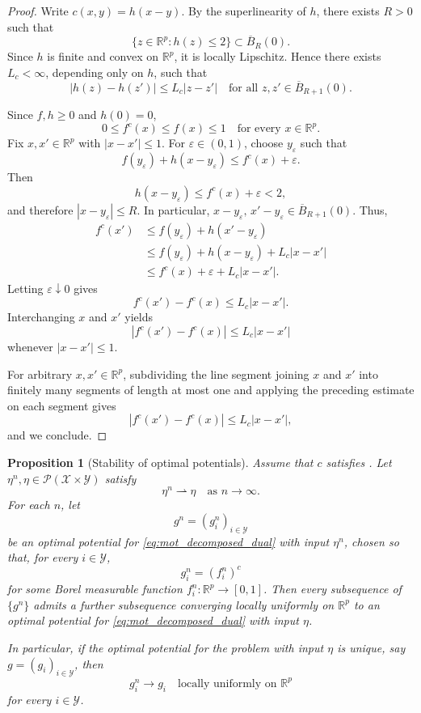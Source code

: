 \documentclass{amsart}
\theoremstyle{plain}
\numberwithin{equation}{section}\newtheorem{theorem}{Theorem}[section]
\newtheorem{proposition}[theorem]{Proposition}
\theoremstyle{remark}
\begin{document}
\begin{proof}
Write $c(x,y)=h(x-y)$. By the superlinearity of $h$, there exists
$R>0$ such that
\[
    \{z\in\mathbb R^p:h(z)\leq2\}
    \subset \overline B_R(0).
\]
Since $h$ is finite and convex on $\mathbb R^p$, it is locally
Lipschitz. Hence there exists $L_c<\infty$, depending only on $h$,
such that
\[
    |h(z)-h(z')|
    \leq
    L_c|z-z'|
    \quad
    \text{for all }
    z,z'\in\overline B_{R+1}(0).
\]

Since $f,h\geq0$ and $h(0)=0$,
\[
    0\leq f^c(x)\leq f(x)\leq1
    \quad
    \text{for every }x\in\mathbb R^p.
\]
Fix $x,x'\in\mathbb R^p$ with $|x-x'|\leq1$. For
$\varepsilon\in(0,1)$, choose $y_\varepsilon$ such that
\[
    f(y_\varepsilon)+h(x-y_\varepsilon)
    \leq
    f^c(x)+\varepsilon.
\]
Then
\[
    h(x-y_\varepsilon)
    \leq
    f^c(x)+\varepsilon
    <2,
\]
and therefore $|x-y_\varepsilon|\leq R$.
In particular, $x-y_\varepsilon,\,
    x'-y_\varepsilon
    \in\overline B_{R+1}(0)$.
Thus,
\begin{align*}
    f^c(x')
    &\leq
    f(y_\varepsilon)+h(x'-y_\varepsilon)\\
    &\leq
    f(y_\varepsilon)+h(x-y_\varepsilon)
    +L_c|x-x'|\\
    &\leq
    f^c(x)+\varepsilon+L_c|x-x'|.
\end{align*}
Letting $\varepsilon\downarrow0$ gives
\[
    f^c(x')-f^c(x)
    \leq
    L_c|x-x'|.
\]
Interchanging $x$ and $x'$ yields
\[
    |f^c(x')-f^c(x)|
    \leq
    L_c|x-x'|
\]
whenever $|x-x'|\leq1$.

For arbitrary $x,x'\in\mathbb R^p$, subdividing the line segment
joining $x$ and $x'$ into finitely many segments of length at most one
and applying the preceding estimate on each segment gives
\[
    |f^c(x')-f^c(x)|
    \leq
    L_c|x-x'|,
\]
and we conclude.
\end{proof}

\begin{proposition}[Stability of optimal potentials]
\label{prop: stability of optimal potentials}
Assume that $c$ satisfies
.
Let $\eta^n,\eta\in\mathcal P(\mathcal X\times\mathcal Y)$ satisfy
\[
    \eta^n\rightharpoonup\eta
    \quad\text{as }n\to\infty.
\]
For each $n$, let
\[
    g^n=(g_i^n)_{i\in\mathcal Y}
\]
be an optimal potential for \eqref{eq:mot_decomposed_dual} with input
$\eta^n$, chosen so that, for every $i\in\mathcal Y$,
\[
    g_i^n=(f_i^n)^c
\]
for some Borel measurable function
$f_i^n:\mathbb R^p\to[0,1]$. Then every subsequence of $\{g^n\}$ admits a further subsequence
converging locally uniformly on $\mathbb R^p$ to an optimal potential
for \eqref{eq:mot_decomposed_dual} with input $\eta$.

In particular, if the optimal potential for the problem with input
$\eta$ is unique, say $g=(g_i)_{i\in\mathcal Y}$, then
\[
    g_i^n\longrightarrow g_i
    \quad
    \text{locally uniformly on }\mathbb R^p
\]
for every $i\in\mathcal Y$.
\end{proposition}
\end{document}
